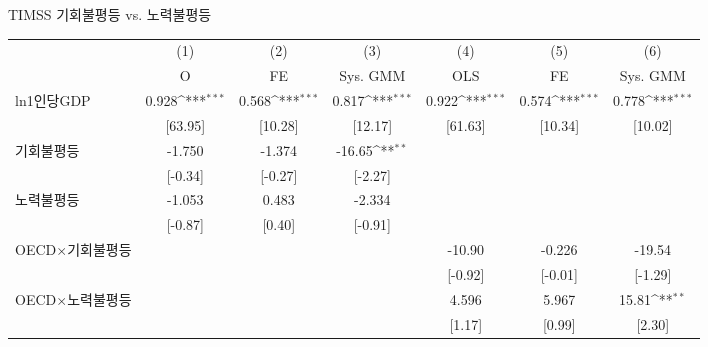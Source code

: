 \centering
\def\sym#1{\ifmmode^{#1}\else\(^{#1}\)\fi}
\caption{TIMSS 기회불평등 vs. 노력불평등\label{tab:timsscomp}}
\begin{tabular}{l*{6}{c}}
\toprule
                    &\multicolumn{1}{c}{(1)}&\multicolumn{1}{c}{(2)}&\multicolumn{1}{c}{(3)}&\multicolumn{1}{c}{(4)}&\multicolumn{1}{c}{(5)}&\multicolumn{1}{c}{(6)}\\
                    &\multicolumn{1}{c}{O}&\multicolumn{1}{c}{FE}&\multicolumn{1}{c}{Sys. GMM}&\multicolumn{1}{c}{OLS}&\multicolumn{1}{c}{FE}&\multicolumn{1}{c}{Sys. GMM}\\
\midrule
ln1인당GDP        &       0.928\sym{***}&       0.568\sym{***}&       0.817\sym{***}&       0.922\sym{***}&       0.574\sym{***}&       0.778\sym{***}\\
                    &     [63.95]         &     [10.28]         &     [12.17]         &     [61.63]         &     [10.34]         &     [10.02]         \\
\addlinespace
기회불평등        &      -1.750         &      -1.374         &      -16.65\sym{**} &                     &                     &                     \\
                    &     [-0.34]         &     [-0.27]         &     [-2.27]         &                     &                     &                     \\
\addlinespace
노력불평등        &      -1.053         &       0.483         &      -2.334         &                     &                     &                     \\
                    &     [-0.87]         &      [0.40]         &     [-0.91]         &                     &                     &                     \\
\addlinespace
OECD$\times$기회불평등&                     &                     &                     &      -10.90         &      -0.226         &      -19.54         \\
                    &                     &                     &                     &     [-0.92]         &     [-0.01]         &     [-1.29]         \\
\addlinespace
OECD$\times$노력불평등&                     &                     &                     &       4.596         &       5.967         &       15.81\sym{**} \\
                    &                     &                     &                     &      [1.17]         &      [0.99]         &      [2.30]         \\

\end{tabular}

